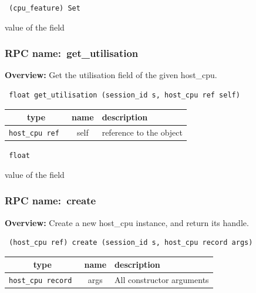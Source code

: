 \vspace{0.3cm}

{\tt 
(cpu\_feature) Set
}


value of the field
\vspace{0.3cm}
\vspace{0.3cm}
\vspace{0.3cm}
\subsubsection{RPC name:~get\_utilisation}

{\bf Overview:} 
Get the utilisation field of the given host\_cpu.

\begin{verbatim} float get_utilisation (session_id s, host_cpu ref self)\end{verbatim}



 
\vspace{0.3cm}
\begin{tabular}{|c|c|p{7cm}|}
 \hline
{\bf type} & {\bf name} & {\bf description} \\ \hline
{\tt host\_cpu ref } & self & reference to the object \\ \hline 

\end{tabular}

\vspace{0.3cm}

{\tt 
float
}


value of the field
\vspace{0.3cm}
\vspace{0.3cm}
\vspace{0.3cm}
\subsubsection{RPC name:~create}

{\bf Overview:} 
Create a new host\_cpu instance, and return its handle.

\begin{verbatim} (host_cpu ref) create (session_id s, host_cpu record args)\end{verbatim}



 
\vspace{0.3cm}
\begin{tabular}{|c|c|p{7cm}|}
 \hline
{\bf type} & {\bf name} & {\bf description} \\ \hline
{\tt host\_cpu record } & args & All constructor arguments \\ \hline 

\end{tabular}

